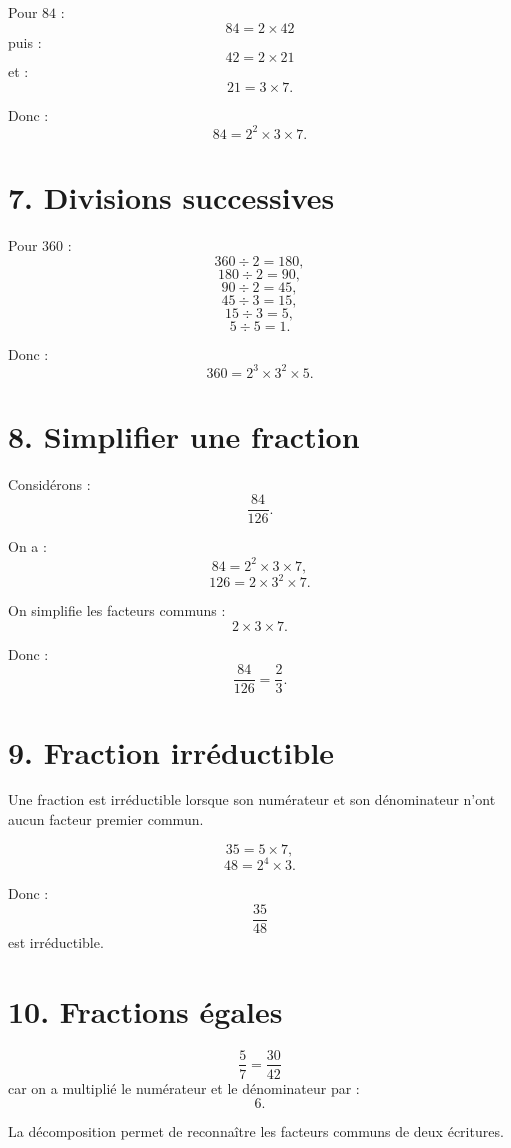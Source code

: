 Pour $84$ :
\[
84=2\times42
\]
puis :
\[
42=2\times21
\]
et :
\[
21=3\times7.
\]

Donc :
\[
\boxed{84=2^2\times3\times7}.
\]


\section{7. Divisions successives}

Pour $360$ :
\[
360\div2=180,
\]
\[
180\div2=90,
\]
\[
90\div2=45,
\]
\[
45\div3=15,
\]
\[
15\div3=5,
\]
\[
5\div5=1.
\]

Donc :
\[
\boxed{360=2^3\times3^2\times5}.
\]

\section{8. Simplifier une fraction}

Considérons :
\[
\dfrac{84}{126}.
\]

On a :
\[
84=2^2\times3\times7,
\]
\[
126=2\times3^2\times7.
\]

On simplifie les facteurs communs :
\[
2\times3\times7.
\]

Donc :
\[
\dfrac{84}{126}=\dfrac23.
\]

\section{9. Fraction irréductible}

\begin{definition}
Une fraction est irréductible lorsque son numérateur et son dénominateur n'ont aucun facteur premier commun.
\end{definition}

\[
35=5\times7,
\]
\[
48=2^4\times3.
\]

Donc :
\[
\dfrac{35}{48}
\]
est irréductible.

\section{10. Fractions égales}

\[
\dfrac57=\dfrac{30}{42}
\]
car on a multiplié le numérateur et le dénominateur par :
\[
6.
\]

La décomposition permet de reconnaître les facteurs communs de deux écritures.

